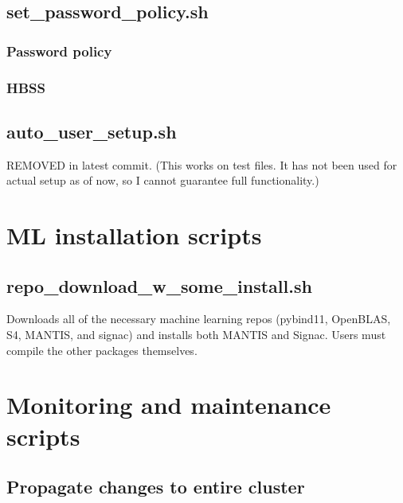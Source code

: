 \documentclass[10pt,letterpaper]{report}
\begin{document}
\section{set\_password\_policy.sh} 	\label{sec:passwd}
\subsection{Password policy} 		\label{subsec:passwdpolicy}
	
\subsection{HBSS}					\label{subsec:HBSS}
	

\section{auto\_user\_setup.sh}			\label{sec:users}
REMOVED in latest commit. (This works on test files. It has not been used for actual setup as of now, so I cannot guarantee full functionality.)

\chapter{ML installation scripts}		\label{ch:install}

\section{repo\_download\_w\_some\_install.sh}	\label{sec:repoDL}
Downloads all of the necessary machine learning repos (pybind11, OpenBLAS, S4, MANTIS, and signac) and installs both MANTIS and Signac. Users must compile the other packages themselves.

	

\chapter{Monitoring and maintenance scripts}		\label{ch:monitor}

\section{Propagate changes to entire cluster} \label{sec:propagate}


\end{document}
